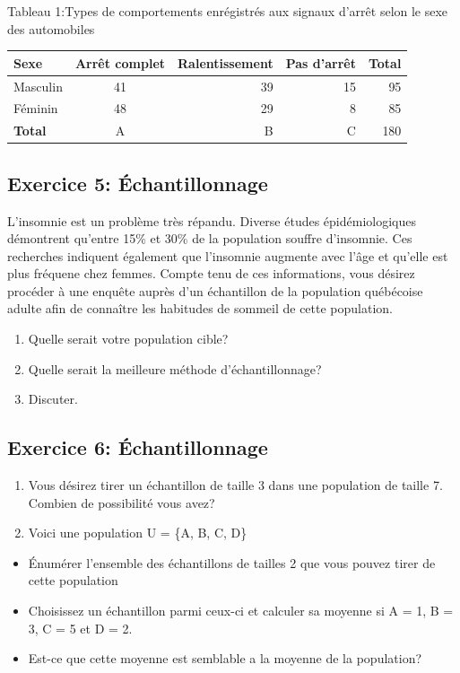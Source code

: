 \documentclass[]{article}
\providecommand{\tightlist}{%
  \setlength{\itemsep}{0pt}\setlength{\parskip}{0pt}}
\begin{document}
Tableau 1:Types de comportements enrégistrés aux signaux d'arrêt selon
le sexe des automobiles

\begin{longtable}[]{@{}lcrrr@{}}
\toprule
\textbf{Sexe} & Arrêt complet & Ralentissement & Pas d'arrêt &
\textbf{Total}\tabularnewline
\midrule
\endhead
Masculin & 41 & 39 & 15 & 95\tabularnewline
Féminin & 48 & 29 & 8 & 85\tabularnewline
\textbf{Total} & A & B & C & 180\tabularnewline
\bottomrule
\end{longtable}

\subsection{Exercice 5:
Échantillonnage}\label{exercice-5-echantillonnage}

L'insomnie est un problème très répandu. Diverse études épidémiologiques
démontrent qu'entre 15\% et 30\% de la population souffre d'insomnie.
Ces recherches indiquent également que l'insomnie augmente avec l'âge et
qu'elle est plus fréquene chez femmes. Compte tenu de ces informations,
vous désirez procéder à une enquête auprès d'un échantillon de la
population québécoise adulte afin de connaître les habitudes de sommeil
de cette population.

\begin{enumerate}
\def\labelenumi{\arabic{enumi}.}
\item
  Quelle serait votre population cible?
\item
  Quelle serait la meilleure méthode d'échantillonnage?
\item
  Discuter.
\end{enumerate}

\subsection{Exercice 6:
Échantillonnage}\label{exercice-6-echantillonnage}

\begin{enumerate}
\def\labelenumi{\arabic{enumi}.}
\item
  Vous désirez tirer un échantillon de taille 3 dans une population de
  taille 7. Combien de possibilité vous avez?
\item
  Voici une population U = \{A, B, C, D\}
\end{enumerate}

\begin{itemize}
\tightlist
\item
  Énumérer l'ensemble des échantillons de tailles 2 que vous pouvez
  tirer de cette population
\item
  Choisissez un échantillon parmi ceux-ci et calculer sa moyenne si A =
  1, B = 3, C = 5 et D = 2.
\item
  Est-ce que cette moyenne est semblable a la moyenne de la population?
\end{itemize}
\end{document}
